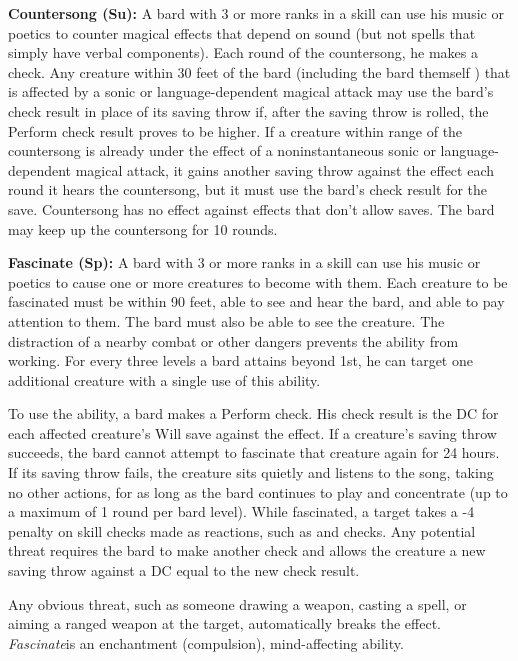 \textbf{Countersong (Su):} A bard with 3 or more ranks in a  skill can use his music or poetics to counter magical effects that depend on sound (but not spells that simply have verbal components). Each round of the countersong, he makes a  check. Any creature within 30 feet of the bard (including the bard themself ) that is affected by a sonic or language-dependent magical attack may use the bard's  check result in place of its saving throw if, after the saving throw is rolled, the Perform check result proves to be higher. If a creature within range of the countersong is already under the effect of a noninstantaneous sonic or language-dependent magical attack, it gains another saving throw against the effect each round it hears the countersong, but it must use the bard's  check result for the save. Countersong has no effect against effects that don't allow saves. The bard may keep up the countersong for 10 rounds.

\textbf{Fascinate (Sp):} A bard with 3 or more ranks in a  skill can use his music or poetics to cause one or more creatures to become  with them. Each creature to be fascinated must be within 90 feet, able to see and hear the bard, and able to pay attention to them. The bard must also be able to see the creature. The distraction of a nearby combat or other dangers prevents the ability from working. For every three levels a bard attains beyond 1st, he can target one additional creature with a single use of this ability.

To use the ability, a bard makes a Perform check. His check result is the DC for each affected creature's Will save against the effect. If a creature's saving throw succeeds, the bard cannot attempt to fascinate that creature again for 24 hours. If its saving throw fails, the creature sits quietly and listens to the song, taking no other actions, for as long as the bard continues to play and concentrate (up to a maximum of 1 round per bard level). While fascinated, a target takes a -4 penalty on skill checks made as reactions, such as  and  checks. Any potential threat requires the bard to make another  check and allows the creature a new saving throw against a DC equal to the new  check result.

Any obvious threat, such as someone drawing a weapon, casting a spell, or aiming a ranged weapon at the target, automatically breaks the effect. \textit{Fascinate}is an enchantment (compulsion), mind-affecting ability.

